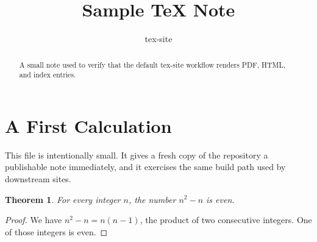 \documentclass[reqno]{amsart}
\newtheorem{theorem}{Theorem}
\begin{document}
\title{Sample TeX Note}
\author{tex-site}

\begin{abstract}
  A small note used to verify that the default tex-site workflow renders
  PDF, HTML, and index entries.
\end{abstract}

\maketitle

\section{A First Calculation}

This file is intentionally small.  It gives a fresh copy of the repository a
publishable note immediately, and it exercises the same build path used by
downstream sites.

\begin{theorem}
  For every integer \(n\), the number \(n^2 - n\) is even.
\end{theorem}

\begin{proof}
  We have \(n^2 - n = n(n-1)\), the product of two consecutive integers.
  One of those integers is even.
\end{proof}
\end{document}
